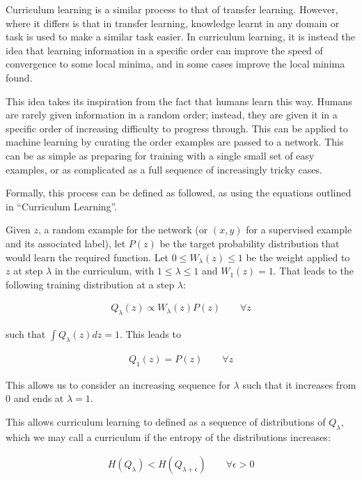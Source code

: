 Curriculum learning is a similar process to that of transfer learning. However,
where it differs is that in transfer learning, knowledge learnt in any domain or
task is used to make a similar task easier. In curriculum learning, it is
instead the idea that learning information in a specific order can improve the
speed of convergence to some local minima, and in some cases improve the local
minima found.

This idea takes its inspiration from the fact that humans learn this way. Humans
are rarely given information in a random order; instead, they are given it in a
specific order of increasing difficulty to progress through. This can be applied
to machine learning by curating the order examples are passed to a network. This
can be as simple as preparing for training with a single small set of easy
examples, or as complicated as a full sequence of increasingly tricky cases.

Formally, this process can be defined as followed, as using the equations
outlined in ``Curriculum Learning''\cite{bengio2009curriculum}.

Given $z$, a random example for the network (or $(x, y)$ for a supervised
example and its associated label), let $P(z)$ be the target probability
distribution that would learn the required function. Let $0 \le W_{\lambda}(z)
\le 1$ be the weight applied to $z$ at step $\lambda$ in the curriculum, with
$1 \le \lambda \le 1$ and $W_1(z) = 1$. That leads to the following training
distribution at a step $\lambda$:

\begin{align}
    Q_{\lambda}(z) \propto W_{\lambda}(z) P(z) \qquad \forall z
\end{align}

such that $\int Q_{\lambda}(z) dz = 1$. This leads to

\begin{align}
    Q_1 (z) = P(z) \qquad \forall z
\end{align}

This allows us to consider an increasing sequence for $\lambda$ such that it
increases from 0 and ends at $\lambda = 1$.

This allows curriculum learning to defined as a sequence of distributions of
$Q_{\lambda}$, which we may call a curriculum if the entropy of the
distributions increases:

\begin{align}
    H(Q_{\lambda}) < H(Q_{\lambda + \epsilon}) \qquad \forall \epsilon > 0
\end{align}

